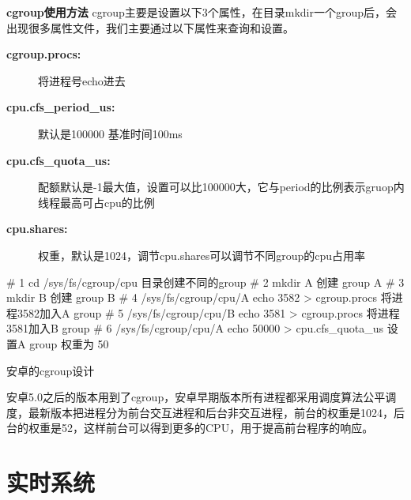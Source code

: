 \textbf{cgroup使用方法}
cgroup主要是设置以下3个属性，在目录mkdir一个group后，会出现很多属性文件，我们主要通过以下属性来查询和设置。

\begin{description}
  \item[\textbf{cgroup.procs:}] 将进程号echo进去
  \item[\textbf{cpu.cfs\_period\_us:}] 默认是100000 基准时间100ms
  \item[\textbf{cpu.cfs\_quota\_us:}] 配额默认是-1最大值，设置可以比100000大，它与period的比例表示gruop内线程最高可占cpu的比例
  \item[\textbf{cpu.shares:}] 权重，默认是1024，调节cpu.shares可以调节不同group的cpu占用率
\end{description}

\begin{latexcmd}[label= cgroup 操作方法]
# 1 cd /sys/fs/cgroup/cpu 目录创建不同的group
# 2 mkdir A  创建 group A
# 3 mkdir B  创建 group B
# 4 /sys/fs/cgroup/cpu/A  echo 3582 > cgroup.procs 将进程3582加入A group
# 5 /sys/fs/cgroup/cpu/B  echo 3581 > cgroup.procs 将进程3581加入B group
# 6 /sys/fs/cgroup/cpu/A  echo 50000 > cpu.cfs_quota_us  
    设置A group 权重为 50%
\end{latexcmd}


\begin{example*}
  \wdexpbox
  {\caption{安卓的cgroup设计}}
  {安卓5.0之后的版本用到了cgroup，安卓早期版本所有进程都采用调度算法公平调度，最新版本把进程分为前台交互进程和后台非交互进程，前台的权重是1024，后台的权重是52，这样前台可以得到更多的CPU，用于提高前台程序的响应。}
\end{example*}


\chapter{实时系统}
